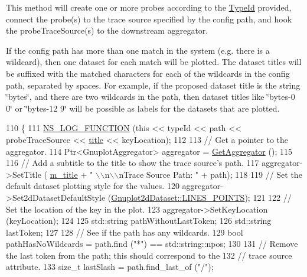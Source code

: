 This method will create one or more probes according to the \hyperlink{classns3_1_1TypeId}{Type\+Id} provided, connect the probe(s) to the trace source specified by the config path, and hook the probe\+Trace\+Source(s) to the downstream aggregator.

If the config path has more than one match in the system (e.\+g. there is a wildcard), then one dataset for each match will be plotted. The dataset titles will be suffixed with the matched characters for each of the wildcards in the config path, separated by spaces. For example, if the proposed dataset title is the string \char`\"{}bytes\char`\"{}, and there are two wildcards in the path, then dataset titles like \char`\"{}bytes-\/0 0\char`\"{} or \char`\"{}bytes-\/12 9\char`\"{} will be possible as labels for the datasets that are plotted. 
\begin{DoxyCode}
110 \{
111   \hyperlink{log-macros-disabled_8h_a90b90d5bad1f39cb1b64923ea94c0761}{NS\_LOG\_FUNCTION} (\textcolor{keyword}{this} << typeId << path << probeTraceSource << 
      \hyperlink{lte__link__budget_8m_a5b09b57ee35b13a452f0c089c0709f8b}{title} << keyLocation);
112 
113   \textcolor{comment}{// Get a pointer to the aggregator.}
114   Ptr<GnuplotAggregator> aggregator = \hyperlink{classns3_1_1GnuplotHelper_af943d55cff587c86db18e813744be45c}{GetAggregator} ();
115 
116   \textcolor{comment}{// Add a subtitle to the title to show the trace source's path.}
117   aggregator->SetTitle ( \hyperlink{classns3_1_1GnuplotHelper_a06621b5b7087d9aeddc342fba35f95ca}{m\_title} + \textcolor{stringliteral}{" \(\backslash\)\(\backslash\)n\(\backslash\)\(\backslash\)nTrace Source Path: "} + path);
118 
119   \textcolor{comment}{// Set the default dataset plotting style for the values.}
120   aggregator->Set2dDatasetDefaultStyle (\hyperlink{classns3_1_1Gnuplot2dDataset_abdad90b4b2abed9a198e4b19470de882aa28118601e55b944fe3073712a967458}{Gnuplot2dDataset::LINES\_POINTS});
121 
122   \textcolor{comment}{// Set the location of the key in the plot.}
123   aggregator->SetKeyLocation (keyLocation);
124 
125   std::string pathWithoutLastToken;
126   std::string lastToken;
127 
128   \textcolor{comment}{// See if the path has any wildcards.}
129   \textcolor{keywordtype}{bool} pathHasNoWildcards = path.find (\textcolor{stringliteral}{"*"}) == std::string::npos;
130 
131   \textcolor{comment}{// Remove the last token from the path; this should correspond to the }
132   \textcolor{comment}{// trace source attribute.}
133   \textcolor{keywordtype}{size\_t} lastSlash = path.find\_last\_of (\textcolor{stringliteral}{"/"});

\end{DoxyCode}

